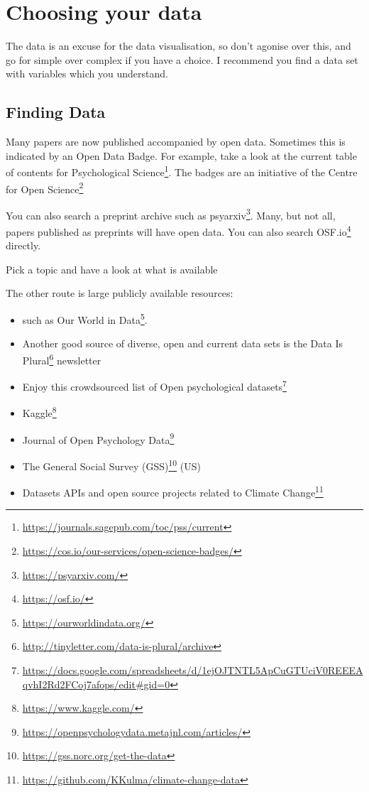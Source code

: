 \documentclass[
  12pt,
  a5paper,
]{book}
\DeclareRobustCommand{\href}[2]{#2\footnote{\url{#1}}}
\providecommand{\tightlist}{%
  \setlength{\itemsep}{0pt}\setlength{\parskip}{0pt}}
\begin{document}
\hypertarget{choosing-your-data}{%
\section{Choosing your data}\label{choosing-your-data}}

The data is an excuse for the data visualisation, so don't agonise over this, and go for simple over complex if you have a choice. I recommend you find a data set with variables which you understand.

\hypertarget{finding-data}{%
\subsection{Finding Data}\label{finding-data}}

Many papers are now published accompanied by open data. Sometimes this is indicated by an Open Data Badge. For example, take a look at the \href{https://journals.sagepub.com/toc/pss/current}{current table of contents for Psychological Science}. The badges are an initiative of the \href{https://cos.io/our-services/open-science-badges/}{Centre for Open Science}

You can also search a preprint archive such as \href{https://psyarxiv.com/}{psyarxiv}. Many, but not all, papers published as preprints will have open data. You can also search \href{https://osf.io/}{OSF.io} directly.

Pick a topic and have a look at what is available

The other route is large publicly available resources:

\begin{itemize}
\tightlist
\item
  such as \href{https://ourworldindata.org/}{Our World in Data}.
\item
  Another good source of diverse, open and current data sets is the \href{http://tinyletter.com/data-is-plural/archive}{Data Is Plural} newsletter
\item
  Enjoy this crowdsourced list of \href{https://docs.google.com/spreadsheets/d/1ejOJTNTL5ApCuGTUciV0REEEAqvhI2Rd2FCoj7afops/edit\#gid=0}{Open psychological datasets}
\item
  \href{https://www.kaggle.com/}{Kaggle}
\item
  \href{https://openpsychologydata.metajnl.com/articles/}{Journal of Open Psychology Data}
\item
  The \href{https://gss.norc.org/get-the-data}{General Social Survey (GSS)} (US)
\item
  \href{https://github.com/KKulma/climate-change-data}{Datasets APIs and open source projects related to Climate Change}
\end{itemize}
\end{document}
